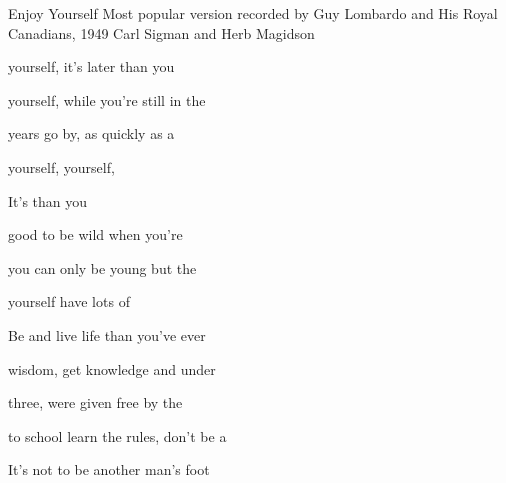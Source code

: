 \begin{SBSong}{Enjoy Yourself}
  {Most popular version recorded by Guy Lombardo and His Royal Canadians, 1949}
  {Carl Sigman and Herb Magidson}
  \begin{SBChorus}
     yourself, it's later than you 
    
     yourself, while you're still in the 
    
     years go by, as quickly as a 
    
     yourself,  yourself,
    
    It's  than you 
  \end{SBChorus}
  \begin{SBVerse}
     good to be wild when you're 
    
     you can only be young but the 
    
     yourself have lots of 
    
    Be  and live life  than you've ever 
  \end{SBVerse}
  \begin{SBVerse}
     wisdom, get knowledge and under
    
     three, were given free by the 
    
     to school learn the rules, don't be a 
    
    It's not  to be  another man's foot 
  \end{SBVerse}
\end{SBSong}
